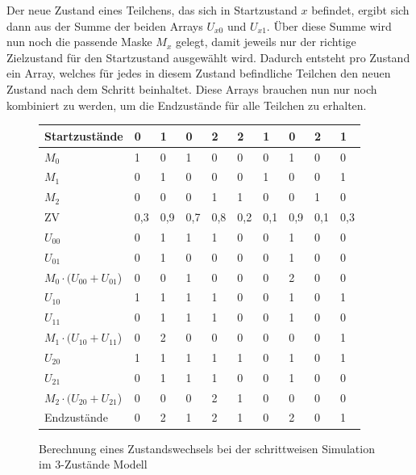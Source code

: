 Der neue Zustand eines Teilchens, das sich in Startzustand $x$ befindet, ergibt sich dann aus der Summe der beiden Arrays $U_{x0}$ und $U_{x1}$. Über diese Summe wird nun noch die passende Maske $M_x$ gelegt, damit jeweils nur der richtige Zielzustand für den Startzustand ausgewählt wird.
Dadurch entsteht pro Zustand ein Array, welches für jedes in diesem Zustand befindliche Teilchen den neuen Zustand nach dem Schritt beinhaltet. Diese Arrays brauchen nun nur noch kombiniert zu werden, um die Endzustände für alle Teilchen zu erhalten.

\begin{figure}
 \begin{tabular}{ l || l | l | l | l | l | l | l | l | l }
  \hline
  Startzustände & \cellcolor{orange!25}0 & \cellcolor{blue!25} 1 & \cellcolor{orange!25}0 & \cellcolor{green!25}2 & \cellcolor{green!25}2 & \cellcolor{blue!25} 1 & \cellcolor{orange!25}0 & \cellcolor{green!25}2 & \cellcolor{blue!25} 1 \\ \hline \hline 
  $M_0$ & \cellcolor{orange!25}1 & 0 & \cellcolor{orange!25}1 & 0 & 0 & 0 & \cellcolor{orange!25}1 & 0 & 0 \\ 
  $M_1$ & 0 & \cellcolor{blue!25}1 & 0 & 0 & 0 & \cellcolor{blue!25}1 & 0 & 0 & \cellcolor{blue!25}1 \\
  $M_2$ & 0 & 0 & 0 & \cellcolor{green!25}1 & \cellcolor{green!25}1 & 0 & 0 & \cellcolor{green!25}1 & 0 \\ \hline \hline
  ZV & 0,3 & 0,9 & 0,7 & 0,8 & 0,2 & 0,1 & 0,9 & 0,1 & 0,3 \\ \hline \hline
  $U_{00}$ & 0 & 1 & 1 & 1 & 0 & 0 & 1 & 0 & 0 \\ 
  $U_{01}$ & 0 & 1 & 0 & 0 & 0 & 0 & 1 & 0 & 0 \\ \hline
  $M_0\cdot (U_{00} + U_{01}$) & \cellcolor{orange!25}0 & 0 & \cellcolor{orange!25}1 & 0 & 0 & 0 & \cellcolor{orange!25}2 & 0 & 0 \\ \hline \hline
  $U_{10}$ & 1 & 1 & 1 & 1 & 0 & 0 & 1 & 0 & 1 \\ 
  $U_{11}$ & 0 & 1 & 1 & 1 & 0 & 0 & 1 & 0 & 0 \\ \hline
  $M_1 \cdot (U_{10}+U_{11}$) & 0 & \cellcolor{blue!25}2 & 0 & 0 & 0 & \cellcolor{blue!25}0 & 0 & 0 & \cellcolor{blue!25}1 \\ \hline \hline
  $U_{20}$ & 1 & 1 & 1 & 1 & 1 & 0 & 1 & 0 & 1 \\ 
  $U_{21}$ & 0 & 1 & 1 & 1 & 0 & 0 & 1 & 0 & 0 \\ \hline
  $M_2\cdot (U_{20}+U_{21}$) & 0 & 0 & 0 & \cellcolor{green!25}2 & \cellcolor{green!25}1 & 0 & 0 & \cellcolor{green!25}0 & 0 \\ \hline \hline
  Endzustände & \cellcolor{orange!25}0 & \cellcolor{blue!25}2 & \cellcolor{orange!25}1 & \cellcolor{green!25}2 & \cellcolor{green!25}1 & \cellcolor{blue!25}0 & \cellcolor{orange!25}2 & \cellcolor{green!25}0 & \cellcolor{blue!25}1 \\ \hline
 \end{tabular}
\caption{Berechnung eines Zustandswechsels bei der schrittweisen Simulation im 3-Zustände Modell}
\label{3s_by_step_tabelle}
\end{figure}

